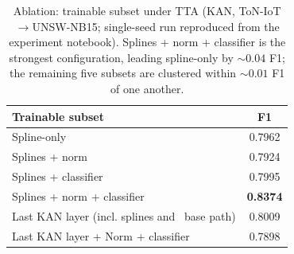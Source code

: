 \begin{table}[h]
\centering
\caption{Ablation: trainable subset under TTA (KAN, ToN-IoT$\to$UNSW-NB15; single-seed run reproduced from the experiment notebook). Splines + norm + classifier is the strongest configuration, leading spline-only by ${\sim}0.04$ F1; the remaining five subsets are clustered within ${\sim}0.01$ F1 of one another.}
\label{tab:ablate_layers}
\begin{tabular}{lc}
\toprule
\textbf{Trainable subset} & \textbf{F1} \\
\midrule
Spline-only                          & 0.7962 \\
Splines + norm                       & 0.7924 \\
Splines + classifier                 & 0.7995 \\
Splines + norm + classifier          & \textbf{0.8374} \\
Last KAN layer (incl. splines and \ base path)    & 0.8009 \\
Last KAN layer + Norm + classifier      & 0.7898 \\
\bottomrule
\end{tabular}
\end{table}

